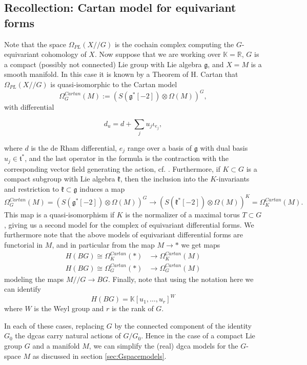 \documentclass[a4paper]{amsart}
\theoremstyle{plain}
\theoremstyle{definition}
\newtheorem{rem}[thm]{Remark}
\newcommand{\alg}[1]{\mathfrak{{#1}}}
\newcommand{\R}{{\mathbb{R}}}
\newcommand{\K}{{\mathbb{K}}}
\newcommand{\beq}[1]{
\begin{equation}\label{#1}
}
\newcommand{\eeq}{
\end{equation}
}
\begin{document}
\subsection{Recollection: Cartan model for equivariant forms}
Note that the space $\Omega_{PL}(X//G)$ is the cochain complex computing the $G$-equivariant cohomology of $X$.
Now suppose that we are working over $\K=\R$, $G$ is a compact (possibly not connected) Lie group with Lie algebra $\alg g$, and $X=M$ is a smooth manifold.
In this case it is known by a Theorem of H. Cartan that $\Omega_{PL}(X//G)$ is quasi-isomorphic to the Cartan model 
\[
\Omega_G^{Cartan}(M) :=(S (\alg g^*[-2]) \otimes \Omega(M))^G,
\]
with differential 
\beq{equ:dudef}
d_u = d + \sum_{j} u_j \iota_{e_j},
\eeq
where $d$ is the de Rham differential, $e_j$ range over a basis of $\alg g$ with dual basis $u_j\in \alg t^*$, and the last operator in the formula is the contraction with the corresponding vector field generating the action, cf. \cite[Theorem 21]{Libine}.
Furthermore, if $K\subset G$ is a compact subgroup with Lie algebra $\alg k$, then the inclusion into the $K$-invariants and restriction to $\alg k\subset \alg g$ induces a map 
\[
\Omega_G^{Cartan}(M)= (S (\alg g^*[-2 ]) \otimes \Omega(M))^G \to (S ( \alg k^*[-2]) \otimes \Omega(M))^K=\Omega_K^{Cartan}(M).
\]
This map is a quasi-isomorphism if $K$ is the normalizer of a maximal torus $T\subset G$, giving us a second model for the complex of equivariant differential forms.
We furthermore note that the above models of equivariant differential forms are functorial in $M$, and in particular from the map $M\to *$ we get maps 
\begin{align*}
H(BG) \cong \Omega_K^{Cartan}(*) &\to \Omega_K^{Cartan}(M) \\
H(BG) \cong \Omega_G^{Cartan}(*) &\to \Omega_G^{Cartan}(M)
\end{align*}
modeling the maps $M//G \to BG$.
Finally, note that using the notation here we can identify
\[
H(BG) = \K[u_1,\dots,u_r]^W
\]
where $W$ is the Weyl group and $r$ is the rank of $G$.

In each of these cases, replacing $G$ by the connected component of the identity $G_0$ the dgcas carry natural actions of $G/G_0$. Hence in the case of a compact Lie group $G$ and a manifold $M$, we can simplify the (real) dgca models for  the $G$-space $M$ as discussed in section \ref{sec:Gspacemodels}.

\end{document}
